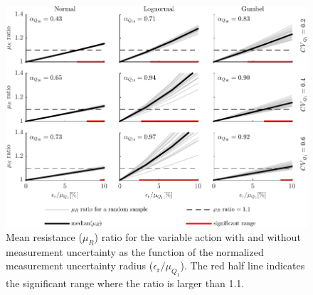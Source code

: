 \begin{figure}[htbp!] 
	\centering    
	\includegraphics[]{dspt_ratio_small_multiples.pdf}
	\caption{Mean resistance ($\mu_R$) ratio for the variable action with and without measurement uncertainty as the function of the normalized measurement uncertainty radius ($\epsilon_\mathrm{r}/\mu_{Q_1}$). The red half line indicates the significant range where the ratio is larger than 1.1.}
	\label{fig:dspt_ratio_small_multiples}
\end{figure}

